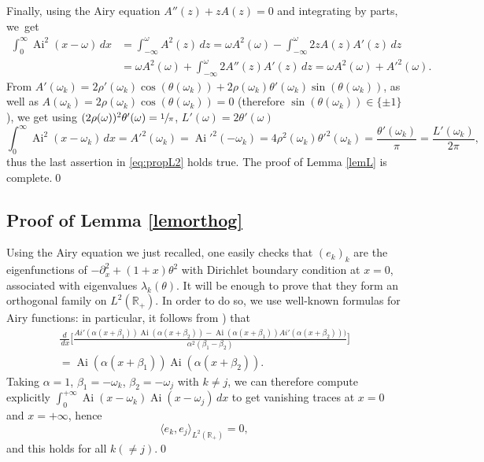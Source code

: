 \documentclass[11pt]{article}
\DeclareMathOperator{\Ai}{Ai}
\theoremstyle{plain}
\theoremstyle{definition}
\begin{document}
Finally, using the Airy equation $A''(z)+z A(z)=0$ and integrating by parts, we~get\vspace*{-3pt}
\begin{align*}
\int_{0}^{\infty}\Ai^2(x-\omega)\,dx&=\int_{-\infty}^{\omega}A^2(z)\,dz  =\omega A^2(\omega)-\int_{-\infty}^{\omega}2zA(z)A'(z)\,dz\\[
-3pt]
& =\omega A^2(\omega)+\int_{-\infty}^{\omega}2A''(z)A'(z)\,dz =\omega A^2(\omega)+A'^2(\omega).
\end{align*}
From $A'(\omega_k)=2\rho'(\omega_k)\cos(\theta(\omega_k))+2\rho(\omega_k)\theta'(\omega_k)\sin(\theta(\omega_k))$, as well as $A(\omega_k)=2\rho(\omega_k)\cos(\theta(\omega_k))=0$ (therefore $\sin(\theta(\omega_k))\in \{\pm1\}$), we get using $(2\rho(\omega))^2\theta'(\omega)=\sfrac{1}{\pi}$, $L'(\omega)=2\theta'(\omega)$\vspace*{-3pt}
\[
\int_0^{\infty}\Ai^2(x-\omega_k)\,dx=A'^2(\omega_k)=\Ai'^2(-\omega_k)=4\rho^2(\omega_k)\theta'^2(\omega_k)=\frac{\theta'(\omega_k)}{\pi}=\frac{L'(\omega_k)}{2\pi},
\]
thus the last assertion in \eqref{eq:propL2} holds true. The proof of Lemma \ref{lemL} is complete.\qed
\subsection{Proof of Lemma \ref{lemorthog}}
Using the Airy equation we just recalled, one easily checks that $(e_k)_{k}$ are the eigenfunctions of $-\partial^2_x+(1+x)\theta^2$ with Dirichlet boundary condition at $x=0$, associated with eigenvalues $\lambda_k(\theta)$. It will be enough to prove that they form an orthogonal family on $L^2(\mathbb{R}_+)$. In order to do so, we use well-known formulas for Airy functions: in particular, it follows from \cite[(3.53)]{AFbook}) that\vspace*{-3pt}
\begin{multline*}
\frac{d}{\,dx} \Big[\frac{Ai'(\alpha(x+\beta_1))\Ai(\alpha(x+\beta_2))-\Ai(\alpha(x+\beta_1))Ai'(\alpha(x+\beta_2)))} {\alpha^2(\beta_1-\beta_2)}\Big]\\ = \Ai(\alpha(x+\beta_1))\Ai(\alpha(x+\beta_2)).
\end{multline*}
Taking $\alpha=1$, $\beta_1=-\omega_k$, $\beta_2=-\omega_j$ with $k\neq j$, we can therefore compute explicitly $\int_{0}^{+\infty} \Ai(x-\omega_{k})\Ai(x-\omega_{j})\,dx$ to get vanishing traces at $x=0$ and $x=+\infty$, hence\vspace*{-3pt}
\[
\langle e_k,e_j \rangle_{L^2(\mathbb{R}_+)}=0,
\]
and this holds for all $k(\neq j)$.\qed
\end{document}
